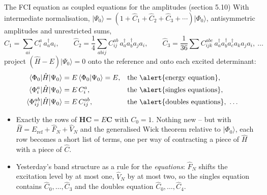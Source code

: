 \documentclass[aspectratio=169,10pt]{beamer}
\newcommand{\ket}[1]{\vert #1\rangle}
\newcommand{\bra}[1]{\langle #1\vert}
\newcommand{\braket}[2]{\langle #1\vert #2\rangle}
\begin{document}
\begin{frame}{The FCI equation as coupled equations for the amplitudes (section 5.10)}
  \small\vspace{-0.3em}
  With intermediate normalisation, $\ket{\Psi_0}=(1+\hat{C}_1+\hat{C}_2+\hat{C}_3+\cdots)\ket{\Phi_0}$, antisymmetric amplitudes and unrestricted sums,
  \[
    \hat{C}_1=\sum_{ai}C_i^a\,a_a^{\dagger}a_i,\qquad
    \hat{C}_2=\frac14\sum_{abij}C_{ij}^{ab}\,a_a^{\dagger}a_b^{\dagger}a_ja_i,\qquad
    \hat{C}_3=\frac{1}{36}\sum C_{ijk}^{abc}\,a_a^{\dagger}a_b^{\dagger}a_c^{\dagger}a_ka_ja_i,\ \dots
  \]
  project $(\hat{H}-E)\ket{\Psi_0}=0$ onto the reference and onto each excited determinant:
  \begin{align*}
    \bra{\Phi_0}\hat{H}\ket{\Psi_0}&=E\,\braket{\Phi_0}{\Psi_0}=E, &&\text{the \alert{energy equation}},\\
    \bra{\Phi_i^a}\hat{H}\ket{\Psi_0}&=E\,C_i^a, &&\text{the \alert{singles equations}},\\
    \bra{\Phi_{ij}^{ab}}\hat{H}\ket{\Psi_0}&=E\,C_{ij}^{ab}, &&\text{the \alert{doubles equations}},\ \dots
  \end{align*}
  \begin{itemize}
    \item Exactly the rows of $\bm{H}\bm{C}=E\bm{C}$ with $C_0=1$. Nothing new -- but with $\hat{H}=E_{\mathrm{ref}}+\hat{F}_N+\hat{V}_N$ and the generalised Wick theorem relative to $\ket{\Phi_0}$, each row becomes a short list of terms, one per way of contracting a piece of $\hat{H}$ with a piece of $\hat{C}$.
    \item Yesterday's band structure as a rule for the \emph{equations}: $\hat{F}_N$ shifts the excitation level by at most one, $\hat{V}_N$ by at most two, so the singles equation contains $\hat{C}_0,\dots,\hat{C}_3$ and the doubles equation $\hat{C}_0,\dots,\hat{C}_4$.
  \end{itemize}
\end{frame}
\end{document}
